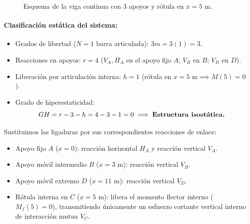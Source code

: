 \begin{figure}[H]
{%
    }
    \caption{Esquema de la viga continua con 3 apoyos y rótula en $x=5\text{ m}$.}
\end{figure}

\paragraph{Clasificación estática del sistema:}
\begin{itemize}
    \item Grados de libertad ($N=1$ barra articulada): $3m = 3(1) = 3$.
    \item Reacciones en apoyos: $r = 4$ ($V_A, H_A$ en el apoyo fijo $A$; $V_B$ en $B$; $V_D$ en $D$).
    \item Liberación por articulación interna: $h = 1$ (rótula en $x=5\text{ m} \implies M(5) = 0$).
    \item Grado de hiperestaticidad:
          \[
              GH = r - 3 - h = 4 - 3 - 1 = 0 \implies \text{\textbf{Estructura isostática.}}
          \]
\end{itemize}


Sustituimos las ligaduras por sus correspondientes reacciones de enlace:
\begin{itemize}
    \item Apoyo fijo $A$ ($x = 0$): reacción horizontal $H_A$ y reacción vertical $V_A$.
    \item Apoyo móvil intermedio $B$ ($x = 3\text{ m}$): reacción vertical $V_B$.
    \item Apoyo móvil extremo $D$ ($x = 11\text{ m}$): reacción vertical $V_D$.
    \item Rótula interna en $C$ ($x = 5\text{ m}$): libera el momento flector interno ($M_f(5) = 0$), transmitiendo únicamente un esfuerzo cortante vertical interno de interacción mutua $V_C$.
\end{itemize}

